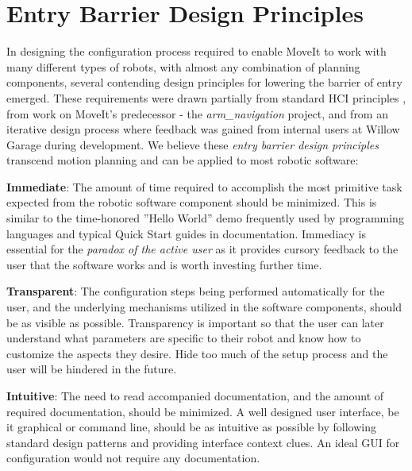 \documentclass[10pt,journal,compsoc]{joser1}
\begin{document}
{%
\section{Entry Barrier Design Principles}
\label{sec::requirements}

In designing the configuration process required to enable MoveIt to work with many different types of robots, with almost any combination of planning components, several contending design principles for lowering the barrier of entry emerged. These requirements were drawn partially from standard HCI principles \cite{galitz2007essential}, from work on MoveIt's predecessor - the \textit{arm\_navigation} project, and from an iterative design process where feedback was gained from internal users at Willow Garage during development. We believe these \textit{entry barrier design principles} transcend motion planning and can be applied to most robotic software:

{\bf Immediate}: The amount of time required to accomplish the most primitive task expected from the robotic software component should be minimized. This is similar to the time-honored ''Hello World'' demo frequently used by programming languages and typical Quick Start guides in documentation. Immediacy is essential for the \textit{paradox of the active user} as it provides cursory feedback to the user that the software works and is worth investing further time.

{\bf Transparent}: The configuration steps being performed automatically for the user, and the underlying mechanisms utilized in the software components, should be as visible as possible. Transparency is important so that the user can later understand what parameters are specific to their robot and know how to customize the aspects they desire. Hide too much of the setup process and the user will be hindered in the future.

{\bf Intuitive}: The need to read accompanied documentation, and the amount of required documentation, should be minimized. A well designed user interface, be it graphical or command line, should be as intuitive as possible by following standard design patterns and providing interface context clues. An ideal GUI for configuration would not require any documentation.

}
\end{document}
